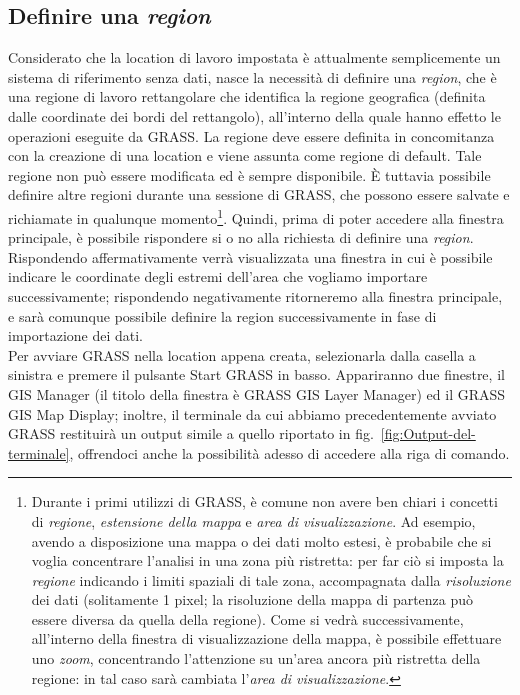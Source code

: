 	\subsection{Definire una \emph{region}}
		Considerato che la location di lavoro impostata è attualmente semplicemente un sistema di riferimento senza dati, nasce la necessità di definire una \emph{region}, che è una regione di lavoro rettangolare che identifica la regione geografica (definita dalle coordinate dei bordi del rettangolo), all'interno della quale hanno effetto le operazioni eseguite da GRASS.  La regione deve essere definita in concomitanza con la creazione di una location e viene assunta come regione di default. Tale regione non può essere modificata ed è sempre disponibile. È tuttavia possibile definire altre regioni durante una sessione di GRASS, che possono essere salvate e richiamate in qualunque momento\footnote{Durante i primi utilizzi di GRASS, è comune non avere ben chiari i concetti di \emph{regione}, \emph{estensione della mappa} e \emph{area di visualizzazione}. Ad esempio, avendo a disposizione una mappa o dei dati molto estesi, è probabile che si voglia concentrare l'analisi in una zona più ristretta: per far ciò si imposta la \emph{regione} indicando i limiti spaziali di tale zona, accompagnata dalla \emph{risoluzione} dei dati (solitamente 1 pixel; la risoluzione della mappa di partenza può essere diversa da quella della regione). Come si vedrà successivamente, all'interno della finestra di visualizzazione della mappa, è possibile effettuare uno \emph{zoom}, concentrando l'attenzione su un'area ancora più ristretta della regione: in tal caso sarà cambiata l'\emph{area di visualizzazione}.}. Quindi, prima di poter accedere alla finestra principale, è possibile rispondere \textsf{si} o \textsf{no} alla richiesta di definire una \emph{region}. Rispondendo affermativamente verrà visualizzata una finestra in cui è possibile indicare le coordinate degli estremi dell'area che vogliamo importare successivamente; rispondendo negativamente ritorneremo alla finestra principale, e sarà comunque possibile definire la region successivamente in fase di importazione dei dati.\\

		Per avviare GRASS nella location appena creata, selezionarla dalla casella a sinistra e premere il pulsante \textsf{Start GRASS} in basso. Appariranno due finestre, il GIS Manager (il titolo della finestra è \textsf{GRASS GIS Layer Manager}) ed il \textsf{GRASS GIS Map Display}; inoltre, il terminale da cui abbiamo precedentemente avviato GRASS restituirà un output simile a quello riportato in fig.~\ref{fig:Output-del-terminale}, offrendoci anche la possibilità adesso di accedere alla riga di comando.
		
